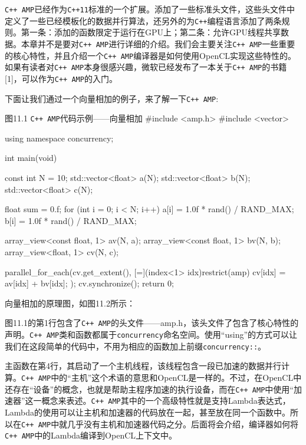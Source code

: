 \texttt{C++ AMP}已经作为\texttt{C++11}标准的一个扩展。添加了一些标准头文件，这些头文件中定义了一些已经模板化的数据并行算法，还另外的为\texttt{C++}编程语言添加了两条规则。第一条：添加的函数限定于运行在GPU上；第二条：允许GPU线程共享数据。本章并不是要对\texttt{C++ AMP}进行详细的介绍。我们会主要关注\texttt{C++ AMP}一些重要的核心特性，并且介绍一个\texttt{C++ AMP}编译器是如何使用OpenCL实现这些特性的。如果有读者对\texttt{C++ AMP}本身很感兴趣，微软已经发布了一本关于\texttt{C++ AMP}的书籍[1]，可以作为\texttt{C++ AMP}的入门。

下面让我们通过一个向量相加的例子，来了解一下\texttt{C++ AMP}:

\begin{codeboxt}[cpp]{图11.1 \texttt{C++ AMP}代码示例——向量相加}
#include <amp.h>
#include <vector>

using namespace concurrency;

int main(void){
  const int N = 10;
  std::vector<float> a(N);
  std::vector<float> b(N);
  std::vector<float> c(N);

  float sum = 0.f;
  for (int i = 0; i < N; i++){
    a[i] = 1.0f * rand() / RAND_MAX;
    b[i] = 1.0f * rand() / RAND_MAX;
  }

  array_view<const float, 1> av(N, a);
  array_view<const float, 1> bv(N, b);
  array_view<float, 1> cv(N, c);

  parallel_for_each(cv.get_extent(),
        [=](index<1> idx)restrict(amp){
            cv[idx] = av[idx] + bv[idx];
        });
  cv.synchronize();
  return 0;
}
\end{codeboxt}

向量相加的原理图，如图11.2所示：


图11.1的第1行包含了\texttt{C++ AMP}的头文件——amp.h，该头文件了包含了核心特性的声明。\texttt{C++ AMP}类和函数都属于\texttt{concurrency}命名空间。使用“using”的方式可以让我们在这段简单的代码中，不用为相应的函数加上前缀\texttt{concurrency::}。

主函数在第4行，其启动了一个主机线程，该线程包含一段已加速的数据并行计算。\texttt{C++ AMP}中的“主机”这个术语的意思和OpenCL是一样的。不过，在OpenCL中还存在“设备”的概念，也就是帮助主程序加速的执行设备，而在\texttt{C++ AMP}中使用“加速器”这一概念来表述。\texttt{C++ AMP}其中的一个高级特性就是支持Lambda表达式，Lambda的使用可以让主机和加速器的代码放在一起，甚至放在同一个函数中。所以在\texttt{C++ AMP}中就几乎没有主机和加速器代码之分。后面将会介绍，编译器如何将\texttt{C++ AMP}中的Lambda编译到OpenCL上下文中。

